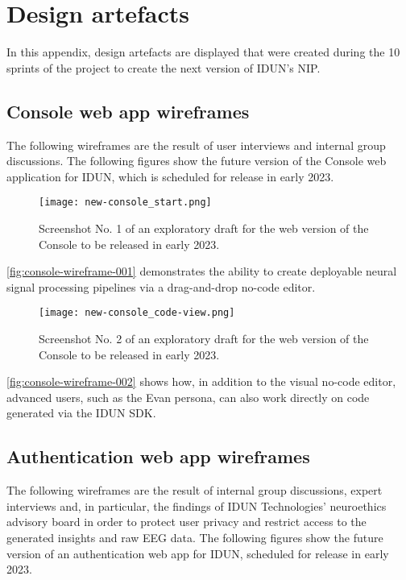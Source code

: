 \chapter{Design artefacts}
\label{appendix5-design-artefacts}
\graphicspath{{Appendix5/Figs/}{Appendix5/Figs/}}

In this appendix, design artefacts are displayed that were created during the 10 sprints of the project to create the next version of IDUN’s NIP.

\section*{Console web app wireframes}

The following wireframes are the result of user interviews and internal group discussions. The following figures show the future version of the Console web application for IDUN, which is scheduled for release in early 2023.

\begin{figure}[!ht]
  \centering
  \texttt{[image: new-console\_start.png]}
  \caption{Screenshot No. 1 of an exploratory draft for the web version of the Console to be released in early 2023.}
  \label{fig:console-wireframe-001}
\end{figure}

\autoref{fig:console-wireframe-001} demonstrates the ability to create deployable neural signal processing pipelines via a drag-and-drop no-code editor.

\begin{figure}[!ht]
  \centering
  \texttt{[image: new-console\_code-view.png]}
  \caption{Screenshot No. 2 of an exploratory draft for the web version of the Console to be released in early 2023.}
  \label{fig:console-wireframe-002}
\end{figure}

\autoref{fig:console-wireframe-002} shows how, in addition to the visual no-code editor, advanced users, such as the Evan persona, can also work directly on code generated via the IDUN SDK.

\section*{Authentication web app wireframes}

The following wireframes are the result of internal group discussions, expert interviews and, in particular, the findings of IDUN Technologies’ neuroethics advisory board in order to protect user privacy and restrict access to the generated insights and raw EEG data. The following figures show the future version of an authentication web app for IDUN, scheduled for release in early 2023.

